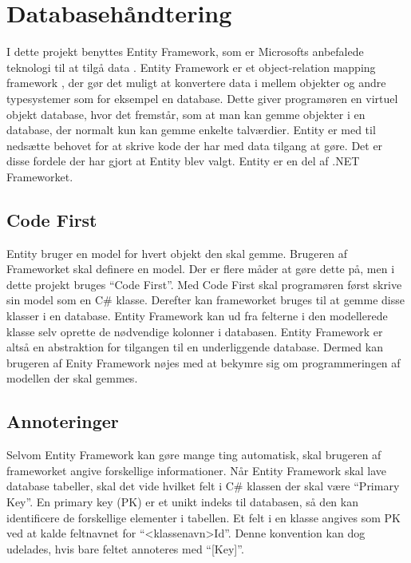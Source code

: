 \section{Databasehåndtering}
\label{sec:database}
I dette projekt benyttes Entity Framework, som er Microsofts anbefalede teknologi til at tilgå data \cite{entity}. Entity Framework er et object-relation mapping framework \cite{lerman2010programming}, der gør det muligt at konvertere data i mellem objekter og andre typesystemer som for eksempel en database. Dette giver programøren en virtuel objekt database, hvor det fremstår, som at man kan gemme objekter i en database, der normalt kun kan gemme enkelte talværdier. Entity er med til nedsætte behovet for at skrive kode der har med data tilgang at gøre. Det er disse fordele der har gjort at Entity blev valgt. Entity er en del af .NET Frameworket.


\subsection{Code First}
\label{sub:code_first}
Entity bruger en model for hvert objekt den skal gemme. Brugeren af Frameworket skal definere en model. Der er flere måder at gøre dette på, men i dette projekt bruges \enquote{Code First}. Med Code First skal programøren først skrive sin model som en C\# klasse. Derefter kan frameworket bruges til at gemme disse klasser i en database. Entity Framework kan ud fra felterne i den modellerede klasse selv oprette de nødvendige kolonner i databasen. Entity Framework er altså en abstraktion for tilgangen til en underliggende database. Dermed kan brugeren af Enity Framework nøjes med at bekymre sig om programmeringen af modellen der skal gemmes.

\subsection{Annoteringer}
\label{sub:annoteringer}
Selvom Entity Framework kan gøre mange ting automatisk, skal brugeren af frameworket angive forskellige informationer. Når Entity Framework skal lave database tabeller, skal det vide hvilket felt i C\# klassen der skal være \enquote{Primary Key}. En primary key (PK) er et unikt indeks til databasen, så den kan identificere de forskellige elementer i tabellen. Et felt i en klasse angives som PK ved at kalde feltnavnet for \enquote{<klassenavn>Id}. Denne konvention kan dog udelades, hvis bare feltet annoteres med \enquote{[Key]}.

